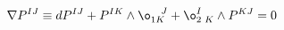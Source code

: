 \begin{equation}
\nabla P^{IJ}\equiv
dP^{IJ}+P^{IK}\wedge\o_{1K}^{\,\,\,\,\,\,J}+\o^I_{2\,\,K}\wedge
P^{KJ}=0\\\label{dq}
\end{equation}

